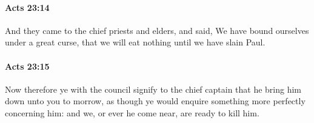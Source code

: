 		\paragraph{Acts 23:14} %
			\label{ACTS-23-14}

			And they came to the chief priests and elders, and said, We have bound ourselves under a great curse, that we will eat nothing until we have slain Paul.

			\begin{framed}
			\scriptsize
				\begin{compactdesc}
					\item[SBLG] 
				\end{compactdesc}
			\end{framed}

		\paragraph{Acts 23:15} %
			\label{ACTS-23-15}

			Now therefore ye with the council signify to the chief captain that he bring him down unto you to morrow, as though ye would enquire something more perfectly concerning him: and we, or ever he come near, are ready to kill him.

